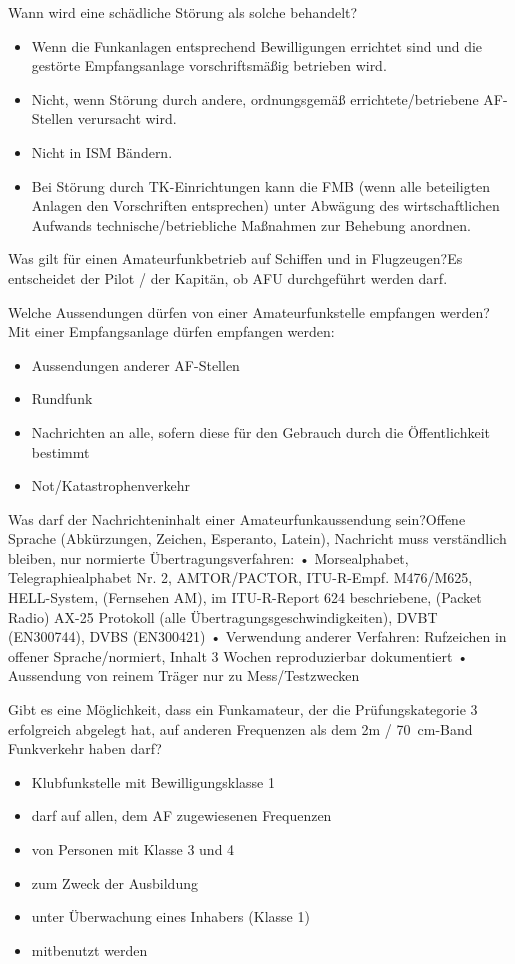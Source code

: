\documentclass[avery5371,grid,frame,a4paper]{flashcards}
\newcommand{\card}[3]{
  \begin{flashcard}[{\chap} -- #1]{#2}#3\end{flashcard}
}
\begin{document}
\card{47}{Wann wird eine schädliche Störung als solche behandelt?}{
  \small
  \begin{itemize}
    \item Wenn die Funkanlagen entsprechend Bewilligungen errichtet sind und die gestörte Empfangsanlage vorschriftsmäßig betrieben wird.
    \item Nicht, wenn Störung durch andere, ordnungsgemäß errichtete/betriebene AF-Stellen verursacht wird.
    \item Nicht in ISM Bändern.
    \item Bei Störung durch TK-Einrichtungen kann die FMB (wenn alle beteiligten Anlagen den Vorschriften entsprechen) unter Abwägung des wirtschaftlichen Aufwands technische/betriebliche Maßnahmen zur Behebung anordnen.
  \end{itemize}
}

\card{48}{Was gilt für einen Amateurfunkbetrieb auf Schiffen und in Flugzeugen?}{Es entscheidet der Pilot / der Kapitän, ob AFU durchgeführt werden darf.}

\card{49}{Welche Aussendungen dürfen von einer Amateurfunkstelle empfangen werden?}{Mit einer Empfangsanlage dürfen empfangen werden: \begin{itemize} \item Aussendungen anderer AF-Stellen \item Rundfunk \item Nachrichten an alle, sofern diese für den
Gebrauch durch die Öffentlichkeit bestimmt \item Not/Katastrophenverkehr\end{itemize}}

\card{50}{Was darf der Nachrichteninhalt einer Amateurfunkaussendung sein?}{\small{Offene Sprache (Abkürzungen, Zeichen, Esperanto, Latein), Nachricht muss verständlich bleiben, nur normierte Übertragungsverfahren:
•  Morsealphabet, Telegraphiealphabet Nr. 2, AMTOR/PACTOR, ITU-R-Empf. M476/M625, HELL-System, (Fernsehen AM), im ITU-R-Report 624 beschriebene, (Packet Radio) AX-25
Protokoll (alle Übertragungsgeschwindigkeiten), DVBT (EN300744), DVBS (EN300421)
•  Verwendung anderer Verfahren: Rufzeichen in offener Sprache/normiert, Inhalt 3 Wochen reproduzierbar dokumentiert
•  Aussendung von reinem Träger nur zu Mess/Testzwecken}}

\card{51}{Gibt es eine Möglichkeit, dass ein Funkamateur, der die Prüfungskategorie 3 erfolgreich abgelegt hat, auf anderen Frequenzen als dem 2m / \SI{70}{\centi\metre}-Band Funkverkehr haben darf?}{\begin{itemize} \item Klubfunkstelle mit Bewilligungsklasse 1 \item darf auf allen, dem AF zugewiesenen Frequenzen \item von Personen mit Klasse 3 und 4 \item zum Zweck der Ausbildung \item unter Überwachung eines Inhabers (Klasse 1) \item mitbenutzt werden\end{itemize}}
\end{document}
